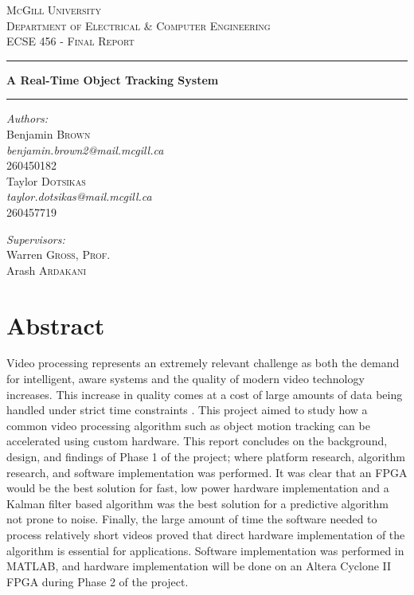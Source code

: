 \documentclass[12pt]{article} %
\newcommand{\HRule}[1][\medskipamount]{\par
  \vspace*{\dimexpr-\parskip-\baselineskip+#1}
  \noindent\rule{\linewidth}{0.2mm}\par
  \vspace*{\dimexpr-\parskip-.5\baselineskip+#1}}
\begin{document}
\begin{titlepage}
\begin{center}
\textsc{\huge McGill University}\\[1.5cm]
\textsc{\LARGE Department of Electrical \& Computer Engineering}\\[1.5cm]
\textsc{\Large ECSE 456 - Final Report}\\[3cm]
\HRule
{\huge \bfseries A Real-Time Object Tracking System \\[.3cm] }
\HRule 
\vspace{1.5cm}
\noindent
\begin{minipage}{0.4\textwidth}
\begin{flushleft} \large
\emph{\Large Authors:}\\
\vspace{.2cm}
Benjamin \textsc{Brown} \\
\textit{benjamin.brown2@mail.mcgill.ca} \\
260450182 \\
\vspace{.2cm}
Taylor \textsc{Dotsikas} \\
\textit{taylor.dotsikas@mail.mcgill.ca} \\
260457719
\end{flushleft}
\begin{flushleft} \large
\emph{\Large Supervisors:}\\
\vspace{.2cm}
Warren \textsc{Gross, Prof.}\\
\vspace{.2cm}
Arash \textsc{Ardakani} 
\end{flushleft}
\end{minipage}%
\end{center}
\end{titlepage}
\pagebreak
\section*{Abstract}
Video processing represents an extremely relevant challenge as both the demand for intelligent, aware systems and the quality of modern video technology increases. This increase in quality comes at a cost of large amounts of data being handled under strict time constraints \cite{3}. This project aimed to study how a common video processing algorithm such as object motion tracking can be accelerated using custom hardware. This report concludes on the background, design, and findings of Phase 1 of the project; where platform research, algorithm research, and software implementation was performed. It was clear that an FPGA would be the best solution for fast, low power hardware implementation and a Kalman filter based algorithm was the best solution for a predictive algorithm not prone to noise. Finally, the large amount of time the software needed to process relatively short videos proved that direct hardware implementation of the algorithm is essential for applications. Software implementation was performed in MATLAB, and hardware implementation will be done on an Altera Cyclone II FPGA during Phase 2 of the project.
\end{document}
